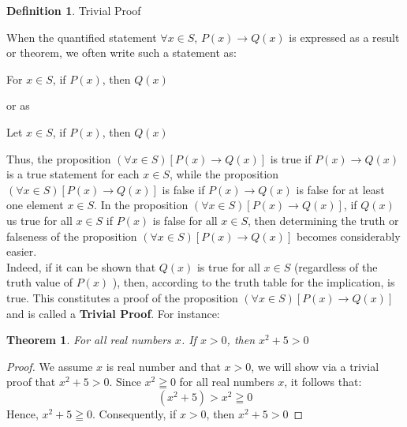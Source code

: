 \documentclass{book}
\newtheorem{theorem}{Theorem}[section]
\theoremstyle{definition}
\newtheorem{definition}{Definition}[section]
\theoremstyle{remark}
\begin{document}
\begin{definition}
Trivial Proof

When the quantified statement $\forall x \in S$, $P(x) \to Q(x)$ is expressed as a result or theorem, we often write such a statement as: 
	\begin{center}
		For $x \in S$, if $P(x)$, then $Q(x)$ 
	\end{center}
or as 
	\begin{center}
		Let $x \in S$, if $P(x)$, then $Q(x)$
	\end{center}
Thus, the proposition $(\forall x \in S)[P(x) \to Q(x)]$ is true if $P(x) \to Q(x)$ is a true statement for  each $x \in S$, while the proposition $(\forall x \in S)[P(x) \to Q(x)]$ is false if $P(x) \to Q(x)$ is false for at least one element $x \in S$. In the proposition $(\forall x \in S)[P(x) \to Q(x)]$, if $Q(x)$ us true for all $x \in S$ if $P(x)$ is false for all $x \in S$, then determining the truth or falseness of the proposition $(\forall x \in S)[P(x) \to Q(x)]$ becomes considerably easier. \\
Indeed, if it can be shown that $Q(x)$ is true for all $x \in S$ (regardless of the truth value of $P(x)$ ), then, according to the truth table for the implication, is true. This constitutes a proof of the proposition $(\forall x \in S)[P(x) \to Q(x)]$ and is called a {\bf Trivial Proof}. For instance: 


\begin{tcolorbox}
	\begin{theorem}
		For all real numbers $x$. If $x>0$, then $x^2 + 5 > 0$
	\end{theorem}
\end{tcolorbox}

\begin{proof}
We assume $x$ is real number and that $x>0$, we will show via a trivial proof that $x^2 + 5 > 0$. Since $x^2 \geqq 0$ for all real numbers $x$, it follows that:
	\begin{equation}
		(x^2 + 5) > x^2 \geqq 0 \nonumber 
	\end{equation}
Hence, $x^2 + 5 \geqq 0$. Consequently, if $x>0$, then $x^2 + 5 > 0$
\end{proof}
\end{definition}
\end{document}
